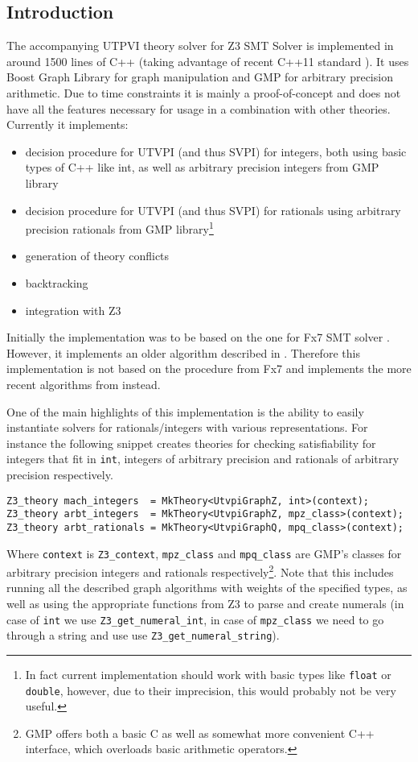 \subsection{Introduction}

The accompanying UTPVI theory solver for Z3 SMT Solver \cite{bib:z3} is
implemented in around 1500 lines of C++ (taking advantage of recent C++11
standard \cite{bib:cc11}). It uses Boost Graph Library
\cite{bib:boost,bib:boost_graph} for graph manipulation and GMP \cite{bib:gmp}
for arbitrary precision arithmetic. Due to time constraints it is mainly a
proof-of-concept and does not have all the features necessary for usage in a
combination with other theories. Currently it implements:
\begin{itemize}
\item decision procedure for UTVPI (and thus SVPI) for integers, both using
  basic types of C++ like int, as well as arbitrary precision integers from GMP
  library
\item decision procedure for UTVPI (and thus SVPI) for rationals using arbitrary
  precision rationals from GMP library\footnote{In fact current implementation
  should work with basic types like \texttt{float} or \texttt{double}, however,
  due to their imprecision, this would probably not be very useful.}
\item generation of theory conflicts
\item backtracking
\item integration with Z3
\end{itemize}
Initially the implementation was to be based on the one for Fx7 SMT solver
\cite{bib:fx7}. However, it implements an older algorithm described in
\cite{bib:harvey_stuckey}. Therefore this implementation is not based on the
procedure from Fx7 and implements the more recent algorithms from
\cite{bib:ms_utvpi} instead.

One of the main highlights of this implementation is the ability to easily
instantiate solvers for rationals/integers with various representations. For
instance the following snippet creates theories for checking satisfiability for
integers that fit in \texttt{int}, integers of arbitrary precision and rationals
of arbitrary precision respectively.
\begin{lstlisting}
Z3_theory mach_integers  = MkTheory<UtvpiGraphZ, int>(context);
Z3_theory arbt_integers  = MkTheory<UtvpiGraphZ, mpz_class>(context);
Z3_theory arbt_rationals = MkTheory<UtvpiGraphQ, mpq_class>(context);
\end{lstlisting}
Where \texttt{context} is \texttt{Z3\_context}, \texttt{mpz\_class} and
\texttt{mpq\_class} are GMP's classes for arbitrary precision integers and
rationals respectively\footnote{GMP offers both a basic C as well as somewhat
more convenient C++ interface, which overloads basic arithmetic operators.}. Note
that this includes running all the described graph algorithms with weights of
the specified types, as well as using the appropriate functions from Z3 to parse
and create numerals (in case of \texttt{int} we use
\texttt{Z3\_get\_numeral\_int}, in case of \texttt{mpz\_class} we need to
go through a string and use
use \texttt{Z3\_get\_numeral\_string}).

